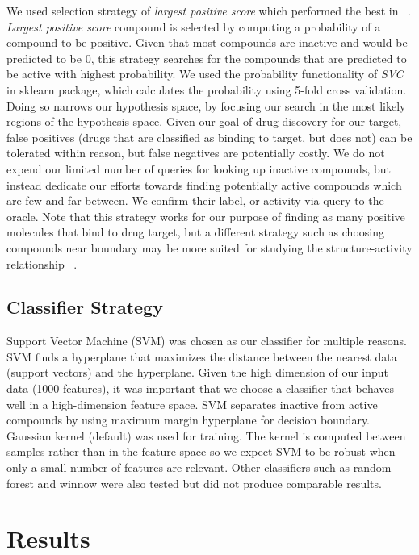 \documentclass[paper=a4, fontsize=11pt]{scrartcl}
\numberwithin{equation}{section}    %
\numberwithin{figure}{section}      %
\numberwithin{table}{section}       %
\numberwithin{equation}{section}    %
\numberwithin{figure}{section}      %
\numberwithin{table}{section}       %
\begin{document}
We used selection strategy of \textit{largest positive score} which performed the best in ~\cite{ref:warmuth}. \textit{Largest positive score} compound is selected by computing a probability of a compound to be positive. Given that most compounds are inactive and would be predicted to be 0, this strategy searches for the compounds that are predicted to be active with highest probability. We used the probability functionality of \textit{SVC} in sklearn package, which calculates the probability using 5-fold cross validation. Doing so narrows our hypothesis space, by focusing our search in the most likely regions of the hypothesis space. Given our goal of drug discovery for our target, false positives (drugs that are classified as binding to target, but does not) can be tolerated within reason, but false negatives are potentially costly. We do not expend our limited number of queries for looking up inactive compounds, but instead dedicate our efforts towards finding potentially active compounds which are few and far between. We confirm their label, or activity via query to the oracle. Note that this strategy works for our purpose of finding as many positive molecules that bind to drug target, but a different strategy such as choosing compounds near boundary may be more suited for studying the structure-activity relationship ~\cite{ref:warmuth}.

\subsection{Classifier Strategy}

Support Vector Machine (SVM) was chosen as our classifier for multiple reasons. SVM finds a hyperplane that maximizes the distance between the nearest data (support vectors) and the hyperplane. Given the high dimension of our input data (1000 features), it was important that we choose a classifier that behaves well in a high-dimension feature space. SVM separates inactive from active compounds by using maximum margin hyperplane for decision boundary.  
Gaussian kernel (default) was used for training. The kernel is computed between samples rather than in the feature space so we expect SVM to be robust when only a small number of features are relevant.
Other classifiers such as random forest and winnow were also tested but did not produce comparable results.


\section{Results}
\end{document}
